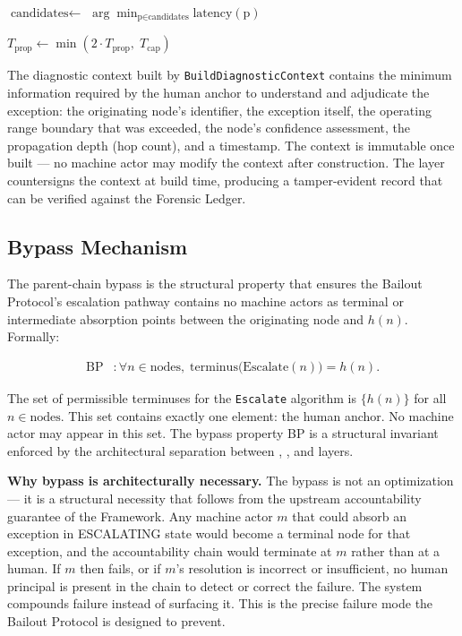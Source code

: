\begin{algorithm}[htbp]
\begin{algorithmic}[1]
  \State $\text{candidates} \leftarrow$ 
  \State \Return $\arg\min_{\text{p} \in \text{candidates}} \text{latency}(\text{p})$
\EndProcedure

  \State $T_{\text{prop}} \leftarrow \min(2 \cdot T_{\text{prop}},\; T_{\text{cap}})$
  \State {}
\EndProcedure
\end{algorithmic}
\end{algorithm}

The diagnostic context built by \texttt{BuildDiagnosticContext} contains the minimum information required by the human anchor to understand and adjudicate the exception: the originating node's identifier, the exception itself, the operating range boundary that was exceeded, the node's confidence assessment, the propagation depth (hop count), and a timestamp. The context is immutable once built — no machine actor may modify the context after construction. The \fact{} layer countersigns the context at build time, producing a tamper-evident record that can be verified against the Forensic Ledger.

\subsection{Bypass Mechanism}\label{sec:bypass}

The parent-chain bypass is the structural property that ensures the Bailout Protocol's escalation pathway contains no machine actors as terminal or intermediate absorption points between the originating node and $h(n)$. Formally:

\begin{align}
\text{BP} &: \forall n \in \text{nodes},\; \text{terminus}\bigl(\text{Escalate}(n)\bigr) = h(n). \tag{BP}
\end{align}

The set of permissible terminuses for the \texttt{Escalate} algorithm is $\{h(n)\}$ for all $n \in \text{nodes}$. This set contains exactly one element: the human anchor. No machine actor may appear in this set. The bypass property BP is a structural invariant enforced by the architectural separation between \purpose{}, \bounds{}, and \fact{} layers.

\medskip\noindent\textbf{Why bypass is architecturally necessary.} The bypass is not an optimization — it is a structural necessity that follows from the upstream accountability guarantee of the \bxthree{} Framework. Any machine actor $m$ that could absorb an exception in ESCALATING state would become a terminal node for that exception, and the accountability chain would terminate at $m$ rather than at a human. If $m$ then fails, or if $m$'s resolution is incorrect or insufficient, no human principal is present in the chain to detect or correct the failure. The system compounds failure instead of surfacing it. This is the precise failure mode the Bailout Protocol is designed to prevent.


